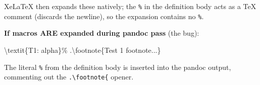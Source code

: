 \documentclass[
  letterpaper,
  DIV=11,
  numbers=noendperiod]{scrartcl}
\newenvironment{Shaded}{\begin{snugshade}}{\end{snugshade}}
\newcommand{\CommentTok}[1]{\textcolor[rgb]{0.37,0.37,0.37}{#1}}
\newcommand{\FunctionTok}[1]{\textcolor[rgb]{0.28,0.35,0.67}{#1}}
\newcommand{\NormalTok}[1]{\textcolor[rgb]{0.00,0.23,0.31}{#1}}
\begin{document}
XeLaTeX then expands these natively; the \texttt{\%} in the definition
body acts as a TeX comment (discards the newline), so the expansion
contains no \texttt{\%}.

\textbf{If macros ARE expanded during pandoc pass} (the bug):

\begin{Shaded}
\begin{Highlighting}[]
\FunctionTok{\textbackslash{}textit}\NormalTok{\{T1: alpha\}}\CommentTok{\%}
\NormalTok{.}\FunctionTok{\textbackslash{}footnote}\NormalTok{\{Test 1 footnote...\}}
\end{Highlighting}
\end{Shaded}

The literal \texttt{\%} from the definition body is inserted into the
pandoc output, commenting out the \texttt{.\textbackslash{}footnote\{}
opener.
\end{document}
